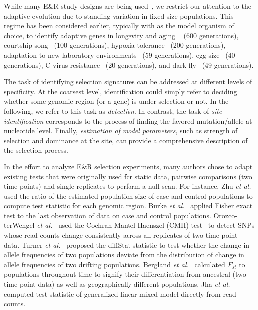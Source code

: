 While many E\&R study designs are being
used~\cite{Barrick2013Genome,schlotterer2015combining}, we restrict
our attention to the adaptive evolution due to standing variation in fixed size 
populations. This regime has been considered earlier, typically with
\dmel as the model organism of choice, to identify adaptive genes in
longevity and aging ~\cite{burke2010genome,remolina2012genomic} (600
generations), courtship song~\cite{turner2011population} (100
generations), hypoxia tolerance~\cite{zhou2011experimental} (200
generations), adaptation to new laboratory
environments~\cite{orozco2012adaptation,franssen2015patterns} (59
generations), egg size~\cite{jha2015whole} (40 generations), C virus
resistance~\cite{martins2014host} (20 generations), and
dark-fly~\cite{izutsu2015dynamics} (49 generations).


The task of identifying selection signatures can be addressed at
different levels of specificity. At the coarsest level, identification
could simply refer to deciding whether some genomic region (or a gene)
is under selection or not. In the following, we refer to this task as
\emph{detection}. In contrast, the task of \emph{site-identification}
corresponds to the process of finding the favored mutation/allele at
nucleotide level. Finally, \emph{estimation of model parameters}, such
as strength of selection and dominance at the site, can provide a
comprehensive description of the selection process.


In the effort to analyze E\&R selection experiments, many authors
chose to adapt existing tests that were originally used for static
data, pairwise comparisons (two time-points) and single replicates to
perform a null scan.  For instance, Zhu \emph{et
  al.}~\cite{zhou2011experimental} used the ratio of the estimated
population size of case and control populations to compute test
statistic for each genomic region. Burke \emph{et
  al.}~\cite{burke2010genome} applied Fisher exact test to the last
observation of data on case and control populations.  Orozco-terWengel
\emph{et al.}~\cite{orozco2012adaptation} used the
Cochran-Mantel-Haenszel (CMH) test~\cite{agresti2011categorical} to
detect SNPs whose read counts change consistently across all
replicates of two time-point data. Turner \emph{et
  al.}~\cite{turner2011population} proposed the diffStat statistic to
test whether the change in allele frequencies of two populations
deviate from the distribution of change in allele frequencies of two
drifting populations. Bergland \emph{et
  al.}~\cite{bergland2014genomic} calculated $F_{st}$ to populations
throughout time to signify their differentiation from ancestral (two
time-point data) as well as geographically different populations. Jha
\emph{et al.}~\cite{jha2015whole} computed test statistic of
generalized linear-mixed model directly from read counts.


